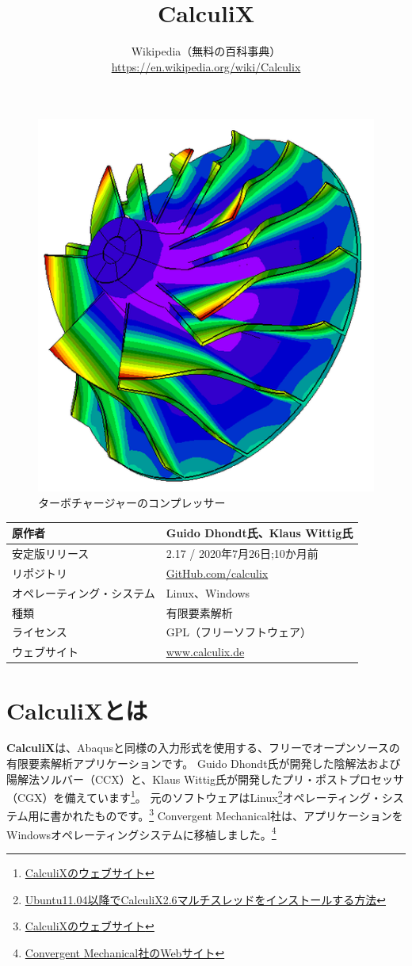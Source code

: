 \documentclass[a4j,12pt,twoside,openany]{ltjsarticle}
\title{CalculiX}
\author{Wikipedia（無料の百科事典）\\\href{https://en.wikipedia.org/wiki/Calculix}{https://en.wikipedia.org/wiki/Calculix}}
\begin{document}
\setcounter{tocdepth}{3}
\maketitle
%
\begin{figure}[H]
	\centering
	\includegraphics[width=.5\columnwidth]{fig/Lav.png}
	\caption{ターボチャージャーのコンプレッサー}
	\label{fig:001}
\end{figure}
%
\begin{table}[H]
	\label{tab:001}
	\centering
	\begin{tabular}{|l|l|}
		\hline
		原作者                     & Guido Dhondt氏、Klaus Wittig氏                          \\ \hline
		安定版リリース             & 2.17 / 2020年7月26日;10か月前                           \\ \hline
		リポジトリ                 & \href{https://github.com/calculix}{GitHub.com/calculix} \\ \hline
		オペレーティング・システム & Linux、Windows                                          \\ \hline
		種類                       & 有限要素解析                                            \\ \hline
		ライセンス                 & GPL（フリーソフトウェア）                               \\ \hline
		ウェブサイト               & \href{http://www.calculix.de/}{www.calculix.de}         \\ \hline
	\end{tabular}
\end{table}
%
\section{CalculiXとは}\label{sec:CalculiX}
%
\textbf{CalculiX}は、Abaqusと同様の入力形式を使用する、フリーでオープンソースの有限要素解析アプリケーションです。
Guido Dhondt氏が開発した陰解法および陽解法ソルバー（CCX）と、Klaus Wittig氏が開発したプリ・ポストプロセッサ（CGX）を備えています\footnote{\href{http://www.calculix.de/}{CalculiXのウェブサイト}}。
元のソフトウェアはLinux\footnote{\href{http://www.libremechanics.com/?q=node/9}{Ubuntu11.04以降でCalculiX2.6マルチスレッドをインストールする方法}}オペレーティング・システム用に書かれたものです。\footnote{\href{http://www.calculix.de/}{CalculiXのウェブサイト}}
Convergent Mechanical社は、アプリケーションをWindowsオペレーティングシステムに移植しました。\footnote{\href{http://www.bconverged.com/}{Convergent Mechanical社のWebサイト}}
\end{document}
